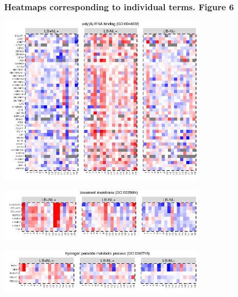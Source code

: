 \documentclass[11pt]{article}\usepackage[]{graphicx}\usepackage[usenames,dvipsnames]{color}
\newenvironment{knitrout}{}{} %
\begin{document}
\clearpage







\subsubsection{Heatmaps corresponding to individual terms. Figure 6}



\begin{knitrout}
\color{fgcolor}

{\centering \includegraphics[width=0.75\textwidth]{figure/toppath_heatmaps_5-1} 

}



\end{knitrout}
\begin{knitrout}
\color{fgcolor}

{\centering \includegraphics[width=0.75\textwidth]{figure/toppath_heatmaps_4-1} 

}



\end{knitrout}
\begin{knitrout}
\color{fgcolor}

{\centering \includegraphics[width=0.75\textwidth]{figure/toppath_heatmaps_3-1} 

}



\end{knitrout}
\end{document}
